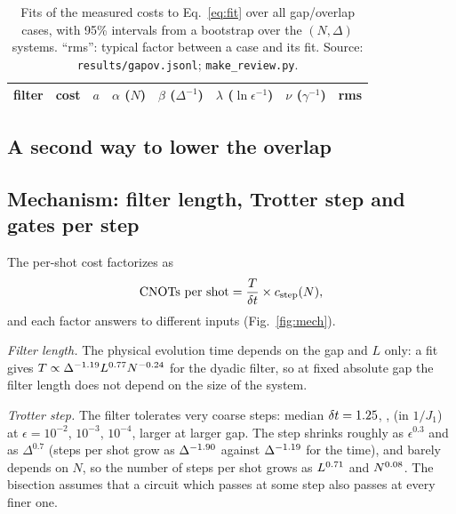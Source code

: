 \documentclass[aps,pra,twocolumn,superscriptaddress,nofootinbib]{revtex4-2}
\begin{document}
\begin{table}[t]
\caption{Fits of the measured costs to Eq.~\eqref{eq:fit} over all \goNcases{} gap/overlap cases, with 95\% intervals
from a bootstrap over the \ciNsys{} $(N,\Delta)$ systems. ``rms'': typical factor between a case and its fit. Source:
\texttt{results/gapov.jsonl}; \texttt{make\_review.py}.}
\label{tab:gofit}
\begin{ruledtabular}
\begin{tabular}{llrrrrrr}
filter & cost & $a$ & $\alpha$ ($N$) & $\beta$ ($\Delta^{-1}$) & $\lambda$ ($\ln\epsilon^{-1}$) & $\nu$ ($\gamma^{-1}$) & rms\\
\midrule

\end{tabular}
\end{ruledtabular}
\end{table}

\subsection{A second way to lower the overlap}
\label{sec:trunc}



\subsection{Mechanism: filter length, Trotter step and gates per step}
\label{sec:mech}

The per-shot cost factorizes as
\begin{equation}
\text{CNOTs per shot}=\frac{T}{\delta t}\times c_{\rm step}(N),
\label{eq:factor}
\end{equation}
and each factor answers to different inputs (Fig.~\ref{fig:mech}).

\emph{Filter length.} The physical evolution time depends on the gap and $L$ only: a fit gives
$T\propto\Delta^{-1.19}L^{0.77}N^{-0.24}$ for the dyadic filter, so at fixed absolute gap the filter length
does not depend on the size of the system.

\emph{Trotter step.} The filter tolerates very coarse steps: median $\delta t=1.25$, \fDtDThree, \fDtDFour{} (in
$1/J_1$) at $\epsilon=10^{-2}$, $10^{-3}$, $10^{-4}$, larger at larger gap. The step shrinks roughly as
$\epsilon^{0.3}$ and as $\Delta^{0.7}$ (steps per shot grow as $\Delta^{-1.90}$ against $\Delta^{-1.19}$
for the time), and barely depends on $N$, so the number of steps per shot grows as $L^{0.71}$ and $N^{0.08}$.
The bisection assumes that a circuit which passes at some step also passes at every finer one.

\end{document}
